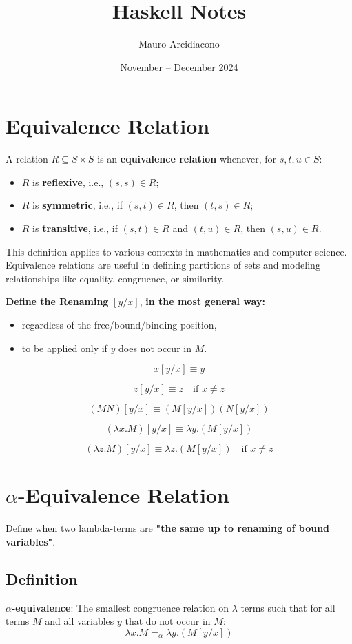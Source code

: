\documentclass{article}
\title{\textbf{Haskell Notes}}
\author{Mauro Arcidiacono}
\date{November -- December 2024}
\begin{document}
\maketitle

\section*{Equivalence Relation}

A relation $R \subseteq S \times S$ is an \textbf{equivalence relation} whenever, for $s, t, u \in S$:
\begin{itemize}
    \item $R$ is \textbf{reflexive}, i.e., $(s, s) \in R$;
    \item $R$ is \textbf{symmetric}, i.e., if $(s, t) \in R$, then $(t, s) \in R$;
    \item $R$ is \textbf{transitive}, i.e., if $(s, t) \in R$ and $(t, u) \in R$, then $(s, u) \in R$.
\end{itemize}

This definition applies to various contexts in mathematics and computer science. Equivalence relations are useful in defining partitions of sets and modeling relationships like equality, congruence, or similarity.

\textbf{Define the Renaming} $[y/x]$, \textbf{in the most general way:}
\begin{itemize}
    \item regardless of the free/bound/binding position,
    \item to be applied only if $y$ does not occur in $M$.
\end{itemize}

\[
x[y/x] \equiv y
\]

\[
z[y/x] \equiv z \quad \text{if } x \neq z
\]

\[
(MN)[y/x] \equiv (M[y/x])(N[y/x])
\]

\[
(\lambda x.M)[y/x] \equiv \lambda y.(M[y/x])
\]

\[
(\lambda z.M)[y/x] \equiv \lambda z.(M[y/x]) \quad \text{if } x \neq z
\]
\section*{$\alpha$-Equivalence Relation}

Define when two lambda-terms are \textbf{"the same up to renaming of bound variables"}.

\subsection*{Definition}
\textbf{$\alpha$-equivalence}: The smallest congruence relation on $\lambda$ terms such that for all terms $M$ and all variables $y$ that do not occur in $M$:
\[
\lambda x.M =_\alpha \lambda y.(M[y/x])
\]
\end{document}
